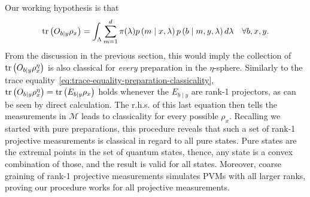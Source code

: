         Our working hypothesis is that
        $$
            \text{tr}\left(  O_{b \mid y} \rho_x \right) = \int_{\Lambda} \sum_{m = 1}^{d} \pi(\lambda) p \left( m \mid x,\lambda \right) p \left( b \mid m,y,\lambda \right) d\lambda \quad\forall b,x,y .
        $$
        From the discussion in the previous section, this would imply the collection of $\text{tr}\left(  O_{b \mid y} \rho_x^\eta \right)$ is also classical for \emph{every} preparation in the $\eta$-sphere. Similarly to the trace equality~\eqref{eq:trace-equality-preparation-classicality}, $\text{tr}\left(  O_{b \mid y} \rho_x^\eta \right) = \text{tr}\left( E_{b \mid y} \rho_x \right)$ holds whenever the $E_{b \mid y}$ are rank-1 projectors, as can be seen by direct calculation. The r.h.s. of this last equation then tells the measurements in $\mathcal{M}$ leads to classicality for every possible $\rho_x$. Recalling we started with pure preparations, this procedure reveals that such a set of rank-1 projective measurements is classical in regard to all pure states. Pure states are the extremal points in the set of quantum states, thence, any state is a convex combination of those, and the result is valid for all states. Moreover, coarse graining of rank-1 projective measurements simulates PVMs with all larger ranks, proving our procedure works for all projective measurements.


